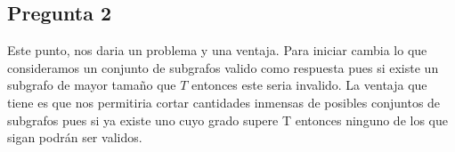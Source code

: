 \documentclass[12pt]{exam}
\begin{document}
\subsection{Pregunta 2}

Este punto, nos daria un problema y una ventaja. Para iniciar cambia lo que consideramos un conjunto de subgrafos valido como respuesta pues si existe un subgrafo de mayor tamaño que $T$ entonces este seria invalido. La ventaja que tiene es que nos permitiria cortar cantidades inmensas de posibles conjuntos de subgrafos pues si ya existe uno cuyo grado supere T entonces ninguno de los que sigan podrán ser validos.
\end{document}
